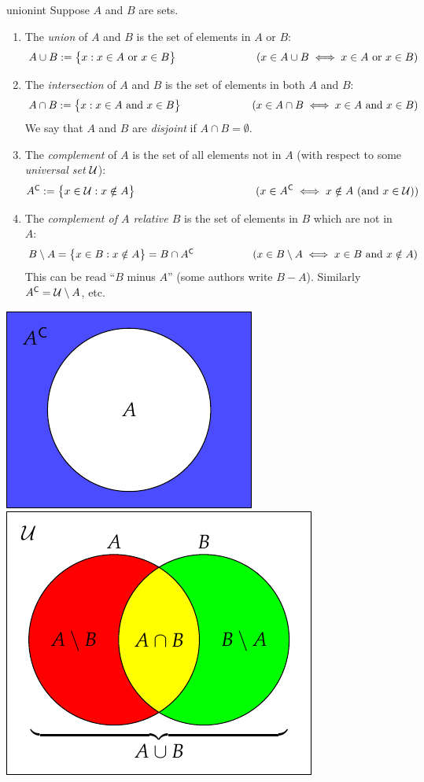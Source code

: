 \begin{defn}{}{unionint}
	Suppose $A$ and $B$ are sets.
	\begin{enumerate}\itemsep0pt
		\item The \emph{union} of $A$ and $B$ is the set of elements in $A$ or $B$:
		\[
			\makebox[210pt][l]{$A\cup B:=\bigl\{x:x\in A\text{ or }x\in B\bigr\}$\hfill} (x\in A\cup B\iff x\in A\text{ or }x\in B)
		\]
		\item The \emph{intersection} of $A$ and $B$ is the set of elements in both $A$ and $B$:
		\[
			\makebox[210pt][l]{$A\cap B:=\bigl\{x:x\in A\text{ and }x\in B\bigr\}$\hfill} (x\in A\cap B\iff x\in A\text{ and }x\in B)
		\]
		We say that $A$ and $B$ are \emph{disjoint} if $A\cap B=\emptyset$.
	  \item The \emph{complement} of $A$ is the set of all elements not in $A$ (with respect to some \emph{universal set}\footnotemark{} $\mathcal{U}$):
		\[
			\makebox[210pt][l]{$\comp A:=\bigl\{x\in\cU:x\notin A\bigr\}$ \hfill} (x\in\comp A\iff x\notin A \ (\text{and }x\in\cU))
		\]
		\item The \emph{complement of $A$ relative $B$} is the set of elements in $B$ which are not in $A$:
		\[
			\makebox[210pt][l]{$B\setminus A=\bigl\{x\in B:x\notin A\bigr\} =B\cap\comp A$\hfill} (x\in B\setminus A\iff x\in B\text{ and } x\notin A)
		\]
		This can be read ``$B$ minus $A$'' (some authors write $B-A$). Similarly ${A}^{\mathsf{C}}=\mathcal{U}\setminus A$, etc.
	\end{enumerate}
	
	\begin{center}
		\includegraphics{sets-05-venncomp}
		\qquad\qquad
		\includegraphics{sets-04-vennunion}
	\end{center}
\end{defn}

